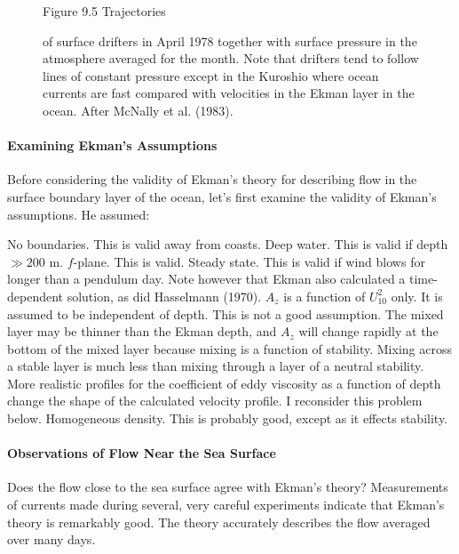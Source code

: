 \begin{figure}[t!]
\footnotesize
Figure 9.5 Trajectories  \rule{0mm}{3ex}of surface drifters in
April 1978 together with surface pressure in the atmosphere averaged for the
month. Note that drifters tend to follow lines of constant pressure except in the
Kuroshio where ocean currents are fast compared with
velocities in the Ekman layer in the ocean. After McNally et al. (1983).
\label{drifterplot}
\vspace{-3ex}
\end{figure}

\paragraph{Examining Ekman's Assumptions}
Before considering the validity of Ekman's
theory for describing flow in the surface boundary layer of the ocean, let's first
examine the validity of Ekman's assumptions. He assumed:
\begin{enumerate}
\vitem No boundaries. This is valid away from coasts.
\vitem Deep water. This is valid if depth $\gg 200$ m.
\vitem $f$-plane. This is valid.
\vitem Steady state. This is valid if wind blows for longer than a pendulum day.
Note however that Ekman also calculated a time-dependent solution, as did
Hasselmann (1970).
\vitem $A_z$ is a function of $U^2_{10}$ only. It is assumed to be
independent of depth. This is not a good assumption. The mixed layer may be thinner than the Ekman depth, and $A_z$ will change rapidly at the bottom
of the mixed layer because mixing is a function of
stability. Mixing across a stable layer is much less than mixing through a layer of a neutral
stability. More realistic profiles for the coefficient of eddy viscosity as a function of
depth change the shape of the calculated velocity profile. I reconsider this problem below.
\vitem Homogeneous density. This is probably good, except as it effects stability.
\end{enumerate}

\paragraph{Observations of Flow Near the Sea Surface}
Does the flow close to the sea surface agree with
Ekman's theory? Measurements of currents made during several, very careful experiments
indicate that Ekman's theory is remarkably good. The theory accurately describes the
flow averaged over many days.


